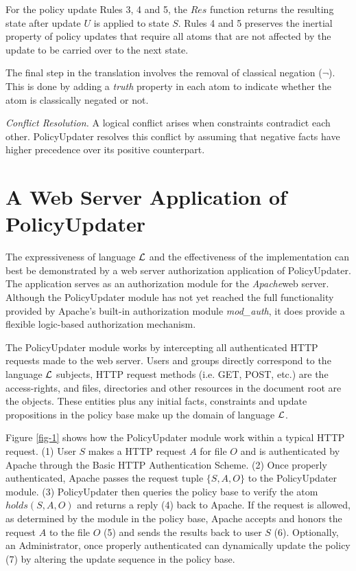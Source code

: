 \documentclass{llncs}
\begin{document}
    For the policy update Rules 3, 4 and 5, the $Res$ function returns
    the resulting state after update $U$ is applied to state $S$. Rules 4 and
    5 preserves the inertial property of policy updates that require all atoms
    that are not affected by the update to be carried over to the next state.

    The final step in the translation involves the removal of classical
    negation ($\lnot$). This is done by adding a \emph{truth} property
    in each atom to indicate whether the atom is classically negated or not.

    \vspace{0.05cm}

    \noindent
    \emph{Conflict Resolution.} A logical conflict arises when constraints
    contradict each other. PolicyUpdater resolves this conflict by assuming
    that negative facts have higher precedence over its positive counterpart.

  \section{A Web Server Application of PolicyUpdater}

    The expressiveness of language $\cal{L}$ and the effectiveness of the
    implementation can best be demonstrated by a web server authorization
    application of PolicyUpdater. The application serves as an authorization
    module for the \emph{Apache}\footnotemark web server. Although the
    PolicyUpdater module has not yet reached the full functionality provided
    by Apache's built-in authorization module \emph{mod\_auth}, it does provide
    a flexible logic-based authorization mechanism.

    The PolicyUpdater module works by intercepting all authenticated HTTP
    requests made to the web server. Users and groups directly correspond to
    the language $\cal{L}$ subjects, HTTP request methods (i.e. GET, POST,
    etc.) are the access-rights, and files, directories and other resources
    in the document root are the objects. These entities plus any initial
    facts, constraints and update propositions in the policy base make up the
    domain of language $\cal{L}$.

    Figure \ref{fig-1} shows how the PolicyUpdater module work within a typical
    HTTP request. (1) User $S$ makes a HTTP request $A$ for file $O$ and is
    authenticated by Apache through the Basic HTTP Authentication Scheme. (2)
    Once properly authenticated, Apache passes the request tuple $\{S, A, O\}$
    to the PolicyUpdater module. (3) PolicyUpdater then queries the policy base
    to verify the atom $holds(S, A, O)$ and returns a reply (4) back to Apache.
    If the request is allowed, as determined by the module in the policy base,
    Apache accepts and honors the request $A$ to the file $O$ (5) and sends the
    results back to user $S$ (6). Optionally, an Administrator, once properly
    authenticated can dynamically update the policy (7) by altering the
    update sequence in the policy base.
\end{document}
